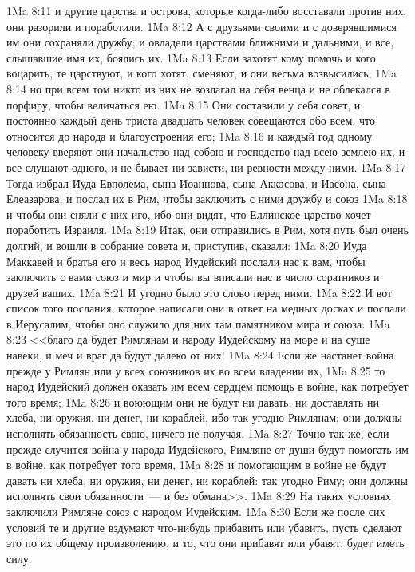 \vs 1Ma 8:11 и другие царства и острова, которые когда-либо восставали против них, они разорили и поработили.
\vs 1Ma 8:12 А с друзьями своими и с доверявшимися им они сохраняли дружбу; и овладели царствами ближними и дальними, и все, слышавшие имя их, боялись их.
\vs 1Ma 8:13 Если захотят кому помочь и кого воцарить, те царствуют, и кого хотят, сменяют, и они весьма возвысились;
\vs 1Ma 8:14 но при всем том никто из них не возлагал на себя венца и не облекался в порфиру, чтобы величаться ею.
\vs 1Ma 8:15 Они составили у себя совет, и постоянно каждый день триста двадцать человек совещаются обо всем, что относится до народа и благоустроения его;
\vs 1Ma 8:16 и каждый год одному человеку вверяют они начальство над собою и господство над всею землею их, и все слушают одного, и не бывает ни зависти, ни ревности между ними.
\rsbpar\vs 1Ma 8:17 Тогда избрал Иуда Евполема, сына Иоаннова, сына Аккосова, и Иасона, сына Елеазарова, и послал их в Рим, чтобы заключить с ними дружбу и союз
\vs 1Ma 8:18 и чтобы они сняли с них иго, ибо они видят, что Еллинское царство хочет поработить Израиля.
\vs 1Ma 8:19 Итак, они отправились в Рим, хотя путь был очень долгий, и вошли в собрание совета и, приступив, сказали:
\vs 1Ma 8:20 Иуда Маккавей и братья его и весь народ Иудейский послали нас к вам, чтобы заключить с вами союз и мир и чтобы вы вписали нас в число соратников и друзей ваших.
\vs 1Ma 8:21 И угодно было это слово перед ними.
\vs 1Ma 8:22 И вот список того послания, которое написали они в ответ на медных досках и послали в Иерусалим, чтобы оно служило для них там памятником мира и союза:
\vs 1Ma 8:23 <<благо да будет Римлянам и народу Иудейскому на море и на суше навеки, и меч и враг да будут далеко от них!
\vs 1Ma 8:24 Если же настанет война прежде у Римлян или у всех союзников их во всем владении их,
\vs 1Ma 8:25 то народ Иудейский должен оказать им всем сердцем помощь в войне, как потребует того время;
\vs 1Ma 8:26 и воюющим они не будут ни давать, ни доставлять ни хлеба, ни оружия, ни денег, ни кораблей, ибо так угодно Римлянам; они должны исполнять обязанность свою, ничего не получая.
\vs 1Ma 8:27 Точно так же, если прежде случится война у народа Иудейского, Римляне от души будут помогать им в войне, как потребует того время,
\vs 1Ma 8:28 и помогающим в войне не будут давать ни хлеба, ни оружия, ни денег, ни кораблей: так угодно Риму; они должны исполнять свои обязанности~--- и без обмана>>.
\vs 1Ma 8:29 На таких условиях заключили Римляне союз с народом Иудейским.
\vs 1Ma 8:30 Если же после сих условий те и другие вздумают что-нибудь прибавить или убавить, пусть сделают это по их общему произволению, и то, что они прибавят или убавят, будет иметь силу.
